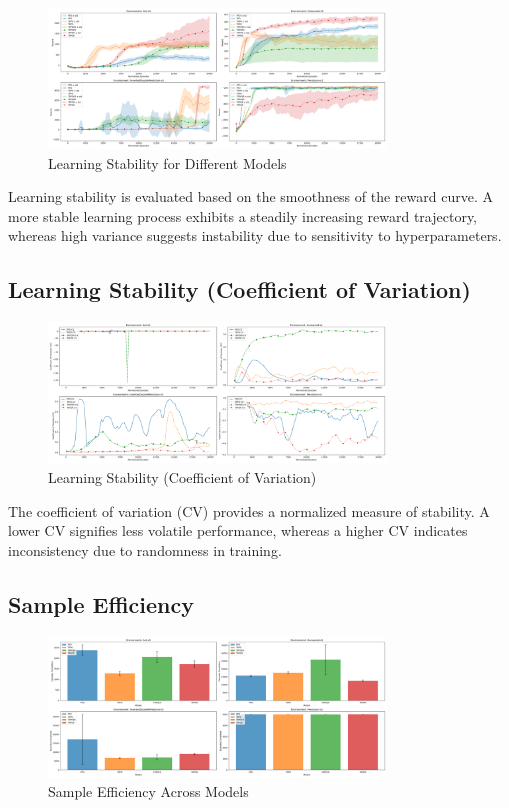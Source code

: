 \documentclass{article}
\begin{document}
\begin{figure}[H]
    \centering
    \includegraphics[width=0.8\textwidth]{.assets/learning_stability.png}
    \caption{Learning Stability for Different Models}
\end{figure}

Learning stability is evaluated based on the smoothness of the reward curve. A more stable learning process exhibits a steadily increasing reward trajectory, whereas high variance suggests instability due to sensitivity to hyperparameters.

\subsection*{Learning Stability (Coefficient of Variation)}

\begin{figure}[H]
    \centering
    \includegraphics[width=0.8\textwidth]{.assets/learning_stability_cv.png}
    \caption{Learning Stability (Coefficient of Variation)}
\end{figure}

The coefficient of variation (CV) provides a normalized measure of stability. A lower CV signifies less volatile performance, whereas a higher CV indicates inconsistency due to randomness in training.

\subsection*{Sample Efficiency}

\begin{figure}[H]
    \centering
    \includegraphics[width=0.8\textwidth]{.assets/sample_efficiency.png}
    \caption{Sample Efficiency Across Models}
\end{figure}
\end{document}
